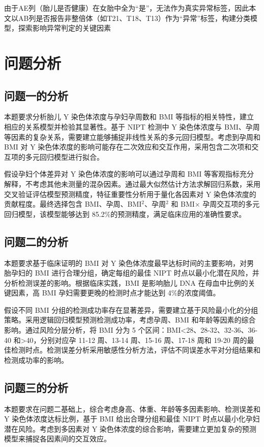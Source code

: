 \documentclass[withoutpreface,bwprint]{cumcmthesis} %
\begin{document}
由于AE列（胎儿是否健康）在女胎中全为“是”，无法作为真实异常标签，因此本文以AB列是否报告非整倍体（如T21、T18、T13）作为“异常”标签，构建分类模型，探索影响异常判定的关键因素

\section{问题分析}
\subsection{问题一的分析}
本题要求分析胎儿 Y 染色体浓度与孕妇孕周数和 BMI 等指标的相关特性，建立相应的关系模型并检验其显著性。基于 NIPT 检测中 Y 染色体浓度与 BMI、孕周等因素的复杂关系，需要建立能够捕捉非线性关系的多元回归模型。考虑到孕周和 BMI 对 Y 染色体浓度的影响可能存在二次效应和交互作用，采用包含二次项和交互项的多元回归模型进行拟合。

假设孕妇个体差异对 Y 染色体浓度的影响可以通过孕周和 BMI 等客观指标充分解释，不考虑其他未测量的混杂因素。通过最大似然估计方法求解回归系数，采用交叉验证评估模型预测精度，特征重要性分析用于量化各因素对 Y 染色体浓度的贡献程度。最终选择包含 BMI、孕周、BMI$^{2}$、孕周$^{2}$ 和 BMI$\times$ 孕周交互项的多元回归模型，该模型能够达到 85.2\%的预测精度，满足临床应用的准确性要求。

\subsection{问题二的分析}

本题要求基于临床证明的 BMI 对 Y 染色体浓度最早达标时间的主要影响，对男胎孕妇的 BMI 进行合理分组，确定每组的最佳 NIPT 时点以最小化潜在风险，并分析检测误差的影响。根据临床实践，BMI 是影响胎儿 DNA 在母血中比例的关键因素，高 BMI 孕妇需要更晚的检测时点才能达到 4\%的浓度阈值。

假设不同 BMI 分组的检测成功率存在显著差异，需要建立基于风险最小化的分组策略。采用逻辑回归模型预测检测成功率，考虑孕周、BMI 和年龄等因素的综合影响。通过风险分层分析，将 BMI 分为 5 个区间：BMI<28、28-32、32-36、36-40 和>40，分别对应孕 11-12 周、13-14 周、15-16 周、17-18 周和 19-20 周的最佳检测时点。检测误差分析采用敏感性分析方法，评估不同误差水平对分组结果和检测成功率的影响。

\subsection{问题三的分析}

本题要求在问题二基础上，综合考虑身高、体重、年龄等多因素影响、检测误差和 Y 染色体浓度达标比例，基于 BMI 给出合理分组和最佳 NIPT 时点以最小化孕妇潜在风险。考虑到多因素对 Y 染色体浓度的综合影响，需要建立更加复杂的预测模型来捕捉各因素间的交互效应。
\end{document}
